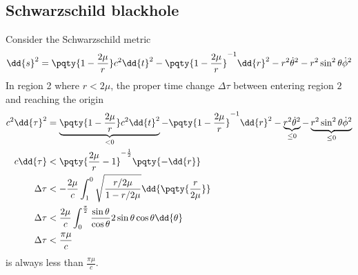 \documentclass[12pt]{article}
\begin{document}
        \subsection{Schwarzschild blackhole}
        Consider the Schwarzschild metric\[
            \dd{s}^2 = \pqty{1 - \frac{2\mu}{r}} c^2 \dd{t}^2 - \pqty{1 - \frac{2\mu}{r}}^{-1} \dd{r}^2 - r^2 \dot{\theta}^2 - r^2 \sin^2\theta \dot{\phi}^2
        \]
        In region 2 where \(r < 2\mu\), the proper time change \(\Delta  \tau\) between entering region \(2\) and reaching the origin\begin{align*}
            c^2 \dd{\tau}^2 &= \underbrace{\pqty{1 - \frac{2\mu}{r}} c^2 \dd{t}^2}_{ < 0} - \pqty{1 - \frac{2\mu}{r}}^{-1} \dd{r}^2 - \underbrace{r^2 \dot{\theta}^2}_{\leq 0} - \underbrace{r^2 \sin^2\theta \dot{\phi}^2}_{\leq 0} \\
            c \dd{\tau} &< \pqty{ \frac{2\mu}{r} - 1}^{-\frac{1}{2}} \pqty{ -\dd{r}}\\
            \Delta \tau &< -\frac{2\mu}{c}\int_{1}^0 \sqrt{ \frac{r / 2\mu}{1 - r / 2\mu}} \dd{\pqty{\frac{r}{2\mu}}}\\
            \Delta \tau &< \frac{2\mu}{c} \int_0^{\frac{\pi}{2} } \frac{\sin\theta}{\cos\theta}  2\sin\theta \cos\theta \dd{\theta}\\
            \Delta \tau &< \frac{\pi\mu}{c} 
        \end{align*}
        is always less than \(\frac{\pi \mu}{c} \).
\end{document}

